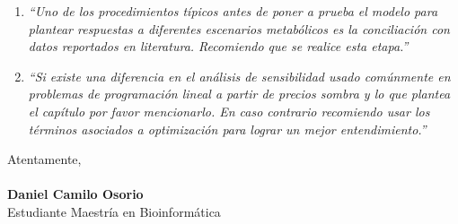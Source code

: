 \documentclass[11pt,a4paper]{article}
\begin{document}
\begin{enumerate}
\item \emph{``Uno de los procedimientos típicos antes de poner a prueba el modelo para plantear respuestas a diferentes escenarios metabólicos es la conciliación con datos reportados en literatura. Recomiendo que se realice esta etapa.''}

\item \emph{``Si existe una diferencia en el análisis de sensibilidad usado comúnmente en problemas de programación lineal a partir de precios sombra y lo que plantea el capítulo por favor mencionarlo. En caso contrario recomiendo usar los términos asociados a optimización para lograr un mejor entendimiento.''}

\end{enumerate}
Atentamente,\\
\\
\textbf{Daniel Camilo Osorio}\\
Estudiante Maestría en Bioinformática
\end{document}
